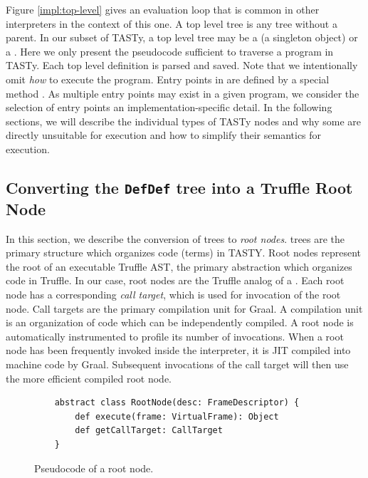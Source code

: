 Figure \ref{impl:top-level} gives an evaluation loop that is common in other interpreters in the context of this one.
A top level tree is any tree without a parent.
In our subset of TASTy, a top level tree may be a  (a singleton object) or a .
Here we only present the pseudocode sufficient to traverse a program in TASTy. 
Each top level definition is parsed and saved.
Note that we intentionally omit \textit{how} to execute the program.
Entry points in  are defined by a special method .
As multiple entry points may exist in a given program, we consider the selection of entry points an implementation-specific detail.
In the following sections, we will describe the individual types of TASTy nodes and why some are directly unsuitable for execution and how to simplify their semantics for execution.

\subsection{Converting the \texttt{DefDef} tree into a Truffle Root Node}
\label{impl:subsection:defdef}

In this section, we describe the conversion of  trees to \textit{root nodes}.
 trees are the primary structure which organizes code (terms) in TASTY.
Root nodes represent the root of an executable Truffle AST, the primary abstraction which organizes code in Truffle.
In our case, root nodes are the Truffle analog of a .
Each root node has a corresponding \textit{call target}, which is used for invocation of the root node.
Call targets are the primary compilation unit for Graal.
A compilation unit is an organization of code which can be independently compiled.
A root node is automatically instrumented\cite{profiling:atom} to profile its number of invocations. 
When a root node has been frequently invoked inside the interpreter, it is JIT compiled into machine code by Graal.
Subsequent invocations of the call target will then use the more efficient compiled root node.

\begin{figure}[!htb]
	\begin{verbatim}
	abstract class RootNode(desc: FrameDescriptor) {
		def execute(frame: VirtualFrame): Object
		def getCallTarget: CallTarget
	}
	\end{verbatim}
	\caption{Pseudocode of a root node.}
	\label{example:root-node}
\end{figure}

